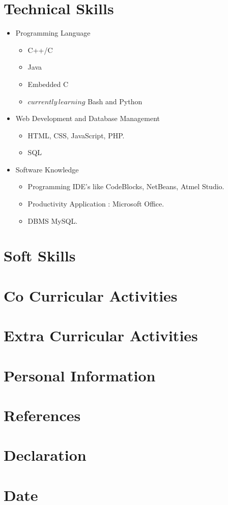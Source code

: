 \documentclass[11pt,a4paper,sans]{moderncv}        %
\begin{document}
\section{Technical Skills}
 \begin{itemize}
 	\item Programming Language 
 	\begin{itemize}
 		\item C++/C
 		\item Java
 		\item Embedded C
 		\item \(currently\, learning\) Bash and Python
 	\end{itemize}
    \item Web Development and Database Management  
    \begin{itemize}
    	\item HTML, CSS, JavaScript, PHP.
    	\item SQL 
    \end{itemize}
 	\item Software Knowledge 
 	\begin{itemize}
 		\item Programming IDE's like CodeBlocks, NetBeans, Atmel Studio.
 		\item Productivity Application : Microsoft Office.
 		\item DBMS MySQL.
 	\end{itemize}
 \end{itemize}

\section{Soft Skills}

\section{Co Curricular Activities}

\section{Extra Curricular Activities}

\section{Personal Information}

\section{References}

\section{Declaration}

\section{Date}
\end{document}
